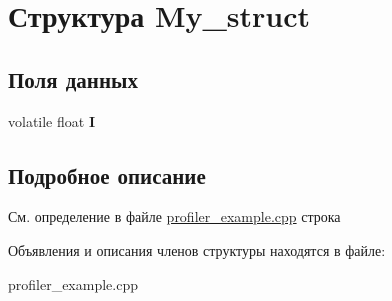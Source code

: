 \hypertarget{struct_my__struct}{\section{Структура \-My\-\_\-struct}
\label{struct_my__struct}
}
\subsection*{Поля данных}
\begin{DoxyCompactItemize}
\item 
\hypertarget{struct_my__struct_a8ea34b2e963fe95ccac1975beb7fff6a}{volatile float {\bfseries \-I}}\label{struct_my__struct_a8ea34b2e963fe95ccac1975beb7fff6a}

\end{DoxyCompactItemize}


\subsection{Подробное описание}


См. определение в файле \hyperlink{profiler__example_8cpp_source}{profiler\-\_\-example.\-cpp} строка 



Объявления и описания членов структуры находятся в файле\-:\begin{DoxyCompactItemize}
\item 
profiler\-\_\-example.\-cpp\end{DoxyCompactItemize}
